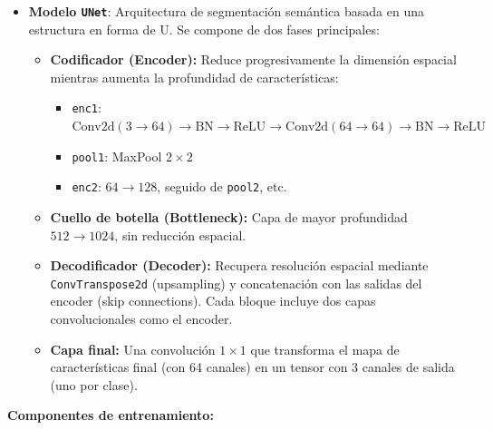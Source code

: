 \begin{itemize}
    \item \textbf{Modelo \texttt{UNet}}: Arquitectura de segmentación semántica basada en una estructura en forma de U. Se compone de dos fases principales:
    \begin{itemize}
        \item \textbf{Codificador (Encoder):} Reduce progresivamente la dimensión espacial mientras aumenta la profundidad de características:
        \begin{itemize}
            \item \texttt{enc1}: \( \text{Conv2d}(3 \rightarrow 64) \rightarrow \text{BN} \rightarrow \text{ReLU} \rightarrow \text{Conv2d}(64 \rightarrow 64) \rightarrow \text{BN} \rightarrow \text{ReLU} \)
            \item \texttt{pool1}: MaxPool \(2 \times 2\)
            \item \texttt{enc2}: \(64 \rightarrow 128\), seguido de \texttt{pool2}, etc.
        \end{itemize}
        \item \textbf{Cuello de botella (Bottleneck):} Capa de mayor profundidad \(512 \rightarrow 1024\), sin reducción espacial.
        \item \textbf{Decodificador (Decoder):} Recupera resolución espacial mediante \texttt{ConvTranspose2d} (upsampling) y concatenación con las salidas del encoder (skip connections). Cada bloque incluye dos capas convolucionales como el encoder.
        \item \textbf{Capa final:} Una convolución \(1 \times 1\) que transforma el mapa de características final (con 64 canales) en un tensor con 3 canales de salida (uno por clase).
    \end{itemize}
\end{itemize}

\vspace{1em}
\textbf{Componentes de entrenamiento:}

